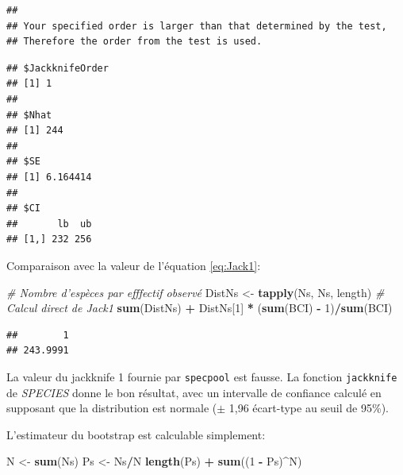 \documentclass[
  11pt,
  french,
  a4paper,
  extrafontsizes,onecolumn,openright
  ]{memoir}
\newenvironment{Shaded}{\begin{snugshade}}{\end{snugshade}}
\newcommand{\CommentTok}[1]{\textcolor[rgb]{0.56,0.35,0.01}{\textit{#1}}}
\newcommand{\DecValTok}[1]{\textcolor[rgb]{0.00,0.00,0.81}{#1}}
\newcommand{\KeywordTok}[1]{\textcolor[rgb]{0.13,0.29,0.53}{\textbf{#1}}}
\newcommand{\NormalTok}[1]{#1}
\newcommand{\OperatorTok}[1]{\textcolor[rgb]{0.81,0.36,0.00}{\textbf{#1}}}
\newcommand{\StringTok}[1]{\textcolor[rgb]{0.31,0.60,0.02}{#1}}
\begin{document}
\begin{verbatim}
## 
## Your specified order is larger than that determined by the test, 
## Therefore the order from the test is used.
\end{verbatim}

\begin{verbatim}
## $JackknifeOrder
## [1] 1
## 
## $Nhat
## [1] 244
## 
## $SE
## [1] 6.164414
## 
## $CI
##       lb  ub
## [1,] 232 256
\end{verbatim}

\normalsize

Comparaison avec la valeur de l'équation \eqref{eq:Jack1}:

\scriptsize

\begin{Shaded}
\begin{Highlighting}[]
\CommentTok{# Nombre d'espèces par efffectif observé}
\NormalTok{DistNs <-}\StringTok{ }\KeywordTok{tapply}\NormalTok{(Ns, Ns, length)}
\CommentTok{# Calcul direct de Jack1}
\KeywordTok{sum}\NormalTok{(DistNs) }\OperatorTok{+}\StringTok{ }\NormalTok{DistNs[}\DecValTok{1}\NormalTok{] }\OperatorTok{*}\StringTok{ }\NormalTok{(}\KeywordTok{sum}\NormalTok{(BCI) }\OperatorTok{-}\StringTok{ }\DecValTok{1}\NormalTok{)}\OperatorTok{/}\KeywordTok{sum}\NormalTok{(BCI)}
\end{Highlighting}
\end{Shaded}

\begin{verbatim}
##        1 
## 243.9991
\end{verbatim}

\normalsize

La valeur du jackknife 1 fournie par \texttt{specpool} est fausse.
La fonction \texttt{jackknife} de \emph{SPECIES} donne le bon résultat, avec un intervalle de confiance calculé en supposant que la distribution est normale (\(\pm\) 1,96 écart-type au seuil de 95\%).

L'estimateur du bootstrap est calculable simplement:

\scriptsize

\begin{Shaded}
\begin{Highlighting}[]
\NormalTok{N <-}\StringTok{ }\KeywordTok{sum}\NormalTok{(Ns)}
\NormalTok{Ps <-}\StringTok{ }\NormalTok{Ns}\OperatorTok{/}\NormalTok{N}
\KeywordTok{length}\NormalTok{(Ps) }\OperatorTok{+}\StringTok{ }\KeywordTok{sum}\NormalTok{((}\DecValTok{1} \OperatorTok{-}\StringTok{ }\NormalTok{Ps)}\OperatorTok{^}\NormalTok{N)}
\end{Highlighting}
\end{Shaded}
\end{document}
